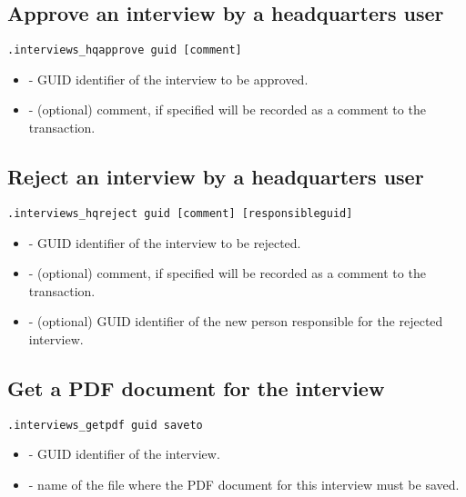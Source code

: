 \subsection{Approve an interview by a headquarters user}
\begin{lstlisting}[style=CommandLineStyle]
.interviews_hqapprove guid [comment]
\end{lstlisting}
\paramsheader
\begin{itemize}
    \item {} - GUID identifier of the interview to be approved.
    \item {} - (optional) comment, if specified will be recorded
          as a comment to the transaction.
\end{itemize}

\subsection{Reject an interview by a headquarters user}
\begin{lstlisting}[style=CommandLineStyle]
.interviews_hqreject guid [comment] [responsibleguid]
\end{lstlisting}
\paramsheader
\begin{itemize}
    \item {} - GUID identifier of the interview to be rejected.
    \item {} - (optional) comment, if specified will be recorded
          as a comment to the transaction.
    \item {} - (optional) GUID identifier of the new
                person responsible for the rejected interview.
\end{itemize}

\subsection{Get a PDF document for the interview}
\begin{lstlisting}[style=CommandLineStyle]
.interviews_getpdf guid saveto
\end{lstlisting}
\paramsheader
\begin{itemize}
    \item {} - GUID identifier of the interview.
    \item {} - name of the file where the PDF document
          for this interview must be saved.
\end{itemize}

